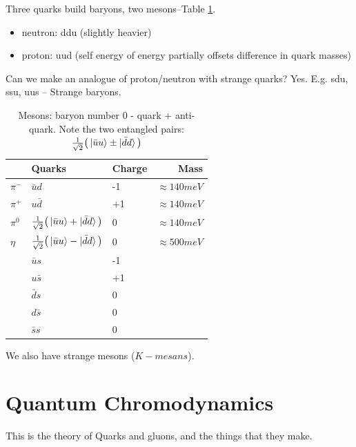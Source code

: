 \documentclass[]{article}
\begin{document}
\begin{figure}[H]
\begin{subfigure}{0.45\textwidth}
	\end{subfigure}
\end{figure}

Three quarks build baryons, two mesons--Table \ref{table:mesons}.
\begin{itemize}
	\item neutron: ddu (slightly heavier)
	\item proton: uud (self energy of energy partially offsets difference in quark masses)
\end{itemize}

Can we make an analogue of proton/neutron with strange quarks? Yes. E.g. sdu, ssu, uus -- Strange baryons.


\begin{table}[H]
	\begin{center}
		\caption[Mesons: baryon number 0 - quark + anti-quark]{Mesons: baryon number 0 - quark + anti-quark. Note the two entangled pairs: $\frac{1}{\sqrt{2}}\big(\ket{\bar{u}u}\pm\ket{\bar{d}d}\big)$}\label{table:mesons}
		\begin{tabular}{|l|l|l|r|} \hline
			&Quarks&Charge&Mass\\ \hline
			$\pi^-$&$\bar{u}d$&-1&$\approx140 meV$ \\ \hline
			$\pi^+$&$u\bar{d}$&+1&$\approx140 meV$  \\ \hline
			$\pi^0$&$\frac{1}{\sqrt{2}}\big(\ket{\bar{u}u}+\ket{\bar{d}d}\big)$&0&$\approx140 meV$  \\ \hline
			$\eta$&$\frac{1}{\sqrt{2}}\big(\ket{\bar{u}u}-\ket{\bar{d}d}\big)$& 0&$\approx500 meV$ \\ \hline
			&$\bar{u}s$&-1& \\ \hline
			&$u\bar{s}$&+1& \\ \hline
			&$\bar{d}s$&0& \\ \hline
			&$d\bar{s}$&0& \\ \hline
			&$\bar{s}s$&0& \\ \hline
		\end{tabular}
	\end{center}
\end{table}

We also have strange mesons ($K-mesans$).


\section{Quantum Chromodynamics}

This is the theory of Quarks and gluons, and the things that they make.
\end{document}
